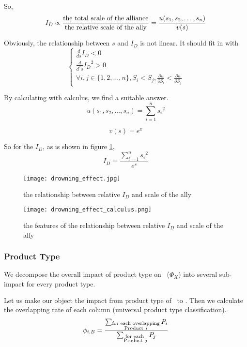 So,
\[
I_D \propto
\frac{\textup{the total scale of the alliance}}{\textup{the relative scale of the ally}}
=
\frac{u(s_1,s_2,\ldots,s_n)}{v(s)}
\]

Obviously, the relationship between $s$ and $I_D$ is not linear. It should fit in with
\[\begin{cases}
\frac{d}{ds} I_D < 0 \\
\frac{d}{d^2s} {I_D}^2 > 0 \\
\forall i,j \in \{1,2,\ldots,n\}, S_i < S_j,
\frac{\partial u}{\partial S_i} < \frac{\partial u}{\partial S_j}
\end{cases}\]

By calculating with calculus, we find a suitable answer.
\[
u(s_1,s_2,\ldots,s_n) = \sum\limits_{i=1}^n {s_i}^2
\]

\[  v(s) = e^x  \]

So for the $I_D$, as is shown in figure \ref{fig:drowning_effect},
\[  I_D = \frac{\sum\limits_{i=1}^n {s_i}^2}{e^s}  \]
\begin{figure}[H]
\centering
\texttt{[image: drowning\_effect.jpg]}
\caption{the relationship between relative $I_D$ and scale of the ally}
\label{fig:drowning_effect}
\end{figure}

\begin{figure}[H]
\centering
\texttt{[image: drowning\_effect\_calculus.png]}
\caption{the features of the relationship between relative $I_D$ and scale of the ally}
\label{fig:drowning_effect_calculus}
\end{figure}

\subsubsection{Product Type}
We decompose the overall impact of product type on \ ($\Phi_X$) into several sub-impact for every product type.

Let us make our object the impact from product type of \B\ to \A. Then we calculate the overlapping rate of each column (universal product type classification).
\[  \phi_{i,B} = 
\frac{\sum_{\begin{subarray}{c}
\textup{for each overlapping} \\ \textup{Product}\ i
\end{subarray}} P_i}%
{\sum_{\begin{subarray}{c}
\textup{for each } \\ \textup{Product}\ j
\end{subarray}} P_j}  \]

